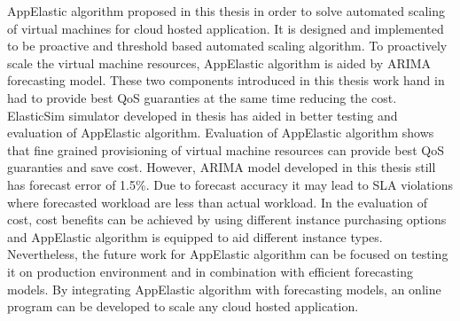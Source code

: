 AppElastic algorithm proposed in this thesis in order to solve automated scaling of virtual machines for cloud hosted application. It is designed and implemented to be proactive and threshold based automated scaling algorithm. To proactively scale the virtual machine resources, AppElastic algorithm is aided by ARIMA forecasting model. These two components introduced in this thesis work hand in had to provide best QoS guaranties at the same time reducing the cost.
\\
ElasticSim simulator developed in thesis has aided in better testing and evaluation of AppElastic algorithm. Evaluation of AppElastic algorithm shows that fine grained provisioning of virtual machine resources can provide best QoS guaranties and save cost. However, ARIMA model developed in this thesis still has forecast error of 1.5\%. Due to forecast accuracy it may lead to SLA violations where forecasted workload are less than actual workload. In the evaluation of cost, cost benefits can be achieved by using different instance purchasing options and AppElastic algorithm is equipped to aid different instance types.
\\
Nevertheless, the future work for AppElastic algorithm can be focused on testing it on production environment and in combination with efficient forecasting models. By integrating AppElastic algorithm with forecasting models, an online program can be developed to scale any cloud hosted application.
